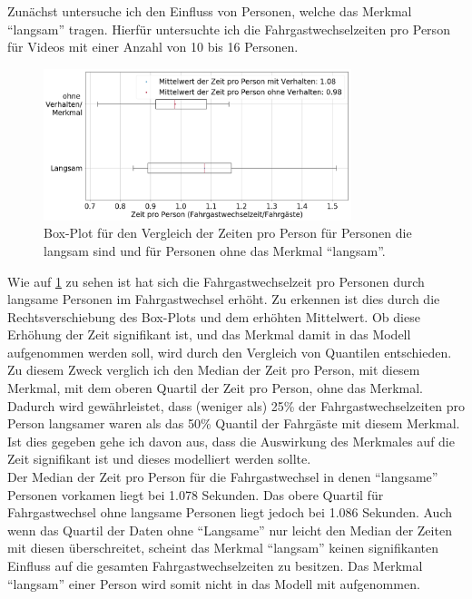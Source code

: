 Zunächst untersuche ich den Einfluss von Personen, welche das Merkmal "`langsam"' tragen. Hierfür untersuchte ich die Fahrgastwechselzeiten pro Person für Videos mit einer Anzahl von 10 bis 16 Personen.
\begin{figure}[H]
	\centering
		\includegraphics[width=0.8\textwidth]{pictures/data_evaluation/behavior/comp_Langsam.png}
	\caption{Box-Plot für den Vergleich der Zeiten pro Person für Personen die langsam sind und für Personen ohne das Merkmal "`langsam"'.}
	\label{fig:BoxPlotLangsam}
\end{figure}
Wie auf \figurename \ref{fig:BoxPlotLangsam} zu sehen ist hat sich die Fahrgastwechselzeit pro Personen durch langsame Personen im Fahrgastwechsel erhöht. Zu erkennen ist dies durch die Rechtsverschiebung des Box-Plots und dem erhöhten Mittelwert. Ob diese Erhöhung der Zeit signifikant ist, und das Merkmal damit in das Modell aufgenommen werden soll, wird durch den Vergleich von Quantilen entschieden. Zu diesem Zweck verglich ich den Median der Zeit pro Person, mit diesem Merkmal, mit dem oberen Quartil der Zeit pro Person, ohne das Merkmal. Dadurch wird gewährleistet, dass (weniger als) 25\% der Fahrgastwechselzeiten pro Person langsamer waren als das 50\% Quantil der Fahrgäste mit diesem Merkmal. Ist dies gegeben gehe ich davon aus, dass die Auswirkung des Merkmales auf die Zeit signifikant ist und dieses modelliert werden sollte.\\
Der Median der Zeit pro Person für die Fahrgastwechsel in denen "`langsame"' Personen vorkamen liegt bei 1.078 Sekunden. Das obere Quartil für Fahrgastwechsel ohne langsame Personen liegt jedoch bei 1.086 Sekunden. Auch wenn das Quartil der Daten ohne "`Langsame"' nur leicht den Median der Zeiten mit diesen überschreitet, scheint das Merkmal "`langsam"' keinen signifikanten Einfluss auf die gesamten Fahrgastwechselzeiten zu besitzen. Das Merkmal "`langsam"' einer Person wird somit nicht in das Modell mit aufgenommen.


